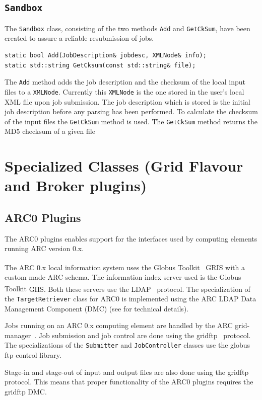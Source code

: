 \documentclass{book}
\newcommand{\GT}{Globus Toolkit\textsuperscript{\textregistered}}
\newcommand{\JobController}{\texttt{JobController}}
\newcommand{\TargetRetriever}{\texttt{TargetRetriever}}
\newcommand{\Sandbox}{\texttt{Sandbox}}
\newcommand{\Submitter}{\texttt{Submitter}}
\newcommand{\XMLNode}{\texttt{XMLNode}}
\begin{document}
\subsection{{\Sandbox}}
The {\Sandbox} class, consisting of the two methods \texttt{Add} and 
\texttt{GetCkSum}, have been created to assure a reliable resubmission 
of jobs. 
\begin{shaded}
\begin{verbatim}
static bool Add(JobDescription& jobdesc, XMLNode& info);
static std::string GetCksum(const std::string& file);
\end{verbatim}
\end{shaded}
The \texttt{Add} method  adds the job description and the checksum of 
the local input files to a {\XMLNode}. Currently this {\XMLNode} is the one 
stored in the user's local XML file upon job submission. The job 
description which is stored is the initial job description before any 
parsing has been performed. To calculate the checksum of the input 
files the \texttt{GetCkSum} method is used. The \texttt{GetCkSum} 
method returns the MD5 checksum of a given file 

\section{Specialized Classes (Grid Flavour and Broker plugins)}
\label{sec:plugins}

\subsection{ARC0 Plugins}

The ARC0 plugins enables support for the interfaces used by computing
elements running ARC version 0.x.

The ARC 0.x local information system uses the {\GT}~\cite{globus} GRIS
with a custom made ARC schema. The information index server used is the
{\GT} GIIS. Both these servers use the LDAP~\cite{ldap}
protocol. The specialization of the {\TargetRetriever} class for ARC0
is implemented using the ARC LDAP Data Management Component (DMC) (see
\cite{hed} for technical details).

Jobs running on an ARC 0.x computing element are handled by the ARC
grid-manager~\cite{gm}. Job submission and job control are done using
the gridftp~\cite{gridftp} protocol. The specializations of the
{\Submitter} and {\JobController} classes use the globus ftp control
library.

Stage-in and stage-out of input and output files are also done using
the gridftp~\cite{gridftp} protocol. This means that proper
functionality of the ARC0 plugins requires the gridftp DMC.
\end{document}
